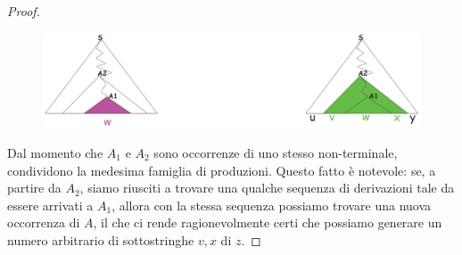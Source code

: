 \documentclass[class=book, crop=false, oneside]{standalone}
\begin{document}
\begin{proof}
  \begin{figure}
    \centering
    \includegraphics[width=.8\textwidth,keepaspectratio]{pl-proof_2}
  \end{figure}

  Dal momento che \(A_1\) e \(A_2\) sono occorrenze di uno stesso non-terminale, condividono la medesima famiglia di produzioni. Questo fatto è notevole: se, a partire da \(A_2\), siamo riusciti a trovare una qualche sequenza di derivazioni tale da essere arrivati a \(A_1\), allora con la stessa sequenza possiamo trovare una nuova occorrenza di \(A\), il che ci rende ragionevolmente certi che possiamo generare un numero arbitrario di sottostringhe \(v, x\) di \(z\).


\end{proof}
\end{document}
